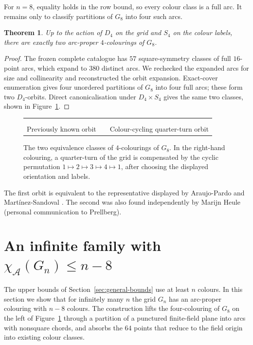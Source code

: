 \documentclass[11pt]{article}
\newtheorem{theorem}{Theorem}
\theoremstyle{definition}
\theoremstyle{remark}
\newcommand{\Dfour}{D_4}
\renewcommand{\le}{\leqslant}
\newcommand{\paintrow}[2]{%
  \foreach \c [count=\x from 0] in {#2}{%
    \fill[col\c] (\x,#1) rectangle ++(1,1);
    \node[font=\sffamily\scriptsize] at (\x+0.5,#1+0.5) {\c};
  }%
}
\newcommand{\finishgrid}[1]{%
  \draw[step=1,white,line width=0.35pt] (0,0) grid (#1,#1);
  \draw[black,line width=0.6pt] (0,0) rectangle (#1,#1);
}
\newcommand{\GridEightA}{%
\begin{tikzpicture}[x=0.5cm,y=0.5cm,baseline=(current bounding box.center)]
  \paintrow{7}{2,1,4,3,2,1,4,3}
  \paintrow{6}{1,3,1,3,2,4,2,4}
  \paintrow{5}{4,1,2,2,3,3,4,1}
  \paintrow{4}{3,3,4,1,4,1,2,2}
  \paintrow{3}{4,4,3,2,3,2,1,1}
  \paintrow{2}{3,2,1,1,4,4,3,2}
  \paintrow{1}{2,4,2,4,1,3,1,3}
  \paintrow{0}{1,2,3,4,1,2,3,4}
  \finishgrid{8}
\end{tikzpicture}}
\newcommand{\GridEightB}{%
\begin{tikzpicture}[x=0.5cm,y=0.5cm,baseline=(current bounding box.center)]
  \paintrow{7}{2,1,4,3,4,1,2,3}
  \paintrow{6}{1,3,1,3,4,2,4,2}
  \paintrow{5}{4,1,2,4,3,3,2,1}
  \paintrow{4}{3,3,2,1,2,1,4,4}
  \paintrow{3}{2,2,3,4,3,4,1,1}
  \paintrow{2}{3,4,1,1,2,4,3,2}
  \paintrow{1}{4,2,4,2,1,3,1,3}
  \paintrow{0}{1,4,3,2,1,2,3,4}
  \finishgrid{8}
\end{tikzpicture}}
\begin{document}
For \(n=8\), equality holds in the row bound, so every colour class is a
full arc.  It remains only to classify partitions of \(G_8\) into four such
arcs.

\begin{theorem}\label{thm:eight-classification}
Up to the action of \(\Dfour\) on the grid and \(S_4\) on the colour labels,
there are exactly two arc-proper \(4\)-colourings of \(G_8\).
\end{theorem}

\begin{proof}
The frozen complete catalogue has \(57\) square-symmetry classes of full
\(16\)-point arcs, which expand to \(380\) distinct arcs.  We rechecked the
expanded arcs for size and collinearity and reconstructed the orbit
expansion.  Exact-cover enumeration gives four unordered partitions of
\(G_8\) into four full arcs; these form two \(\Dfour\)-orbits.  Direct
canonicalisation under \(\Dfour\times S_4\) gives the same two classes,
shown in Figure~\ref{fig:eight}.
\end{proof}

\begin{figure}[htbp]
\centering
\begin{tabular}{@{}ccc@{}}
\GridEightA && \GridEightB\\ \\[-1.5ex]
Previously known orbit &&
Colour-cycling quarter-turn orbit
\end{tabular}
\caption{\label{fig:eight}The two equivalence classes of \(4\)-colourings of \(G_8\).  In
the right-hand colouring, a quarter-turn of the grid is compensated by the
cyclic permutation \(1\mapsto2\mapsto3\mapsto4\mapsto1\), after choosing
the displayed orientation and labels.}
\end{figure}

The first orbit is equivalent to the representative displayed by
Araujo-Pardo and Mart\'inez-Sandoval \cite{AraujoMartinez2026}.  The second
was also found independently by Marijn Heule (personal communication to
Prellberg).

\section{An infinite family with
  \texorpdfstring{\(\chi_{\mathcal{A}}(G_n)\le n-8\)}{chi(G n) at most n-8}}
\label{sec:eight-saving}

The upper bounds of Section~\ref{sec:general-bounds} use at least \(n\) colours.  In this
section we show that for infinitely many \(n\) the grid \(G_n\) has an
arc-proper colouring with \(n-8\) colours.  The construction lifts the
four-colouring of \(G_8\) on the left of Figure~\ref{fig:eight} through
a partition of a punctured finite-field plane into arcs with nonsquare
chords, and absorbs the \(64\) points that reduce to the field origin
into existing colour classes.
\end{document}
